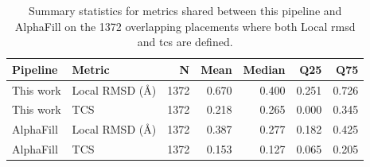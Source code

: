 \begin{table}[ht]
    \centering
    \begin{tabular}{llrrrrr}
        \toprule
        Pipeline  & Metric                      & N    & Mean  & Median & Q25   & Q75   \\
        \midrule
        This work & Local RMSD (\si{\angstrom}) & 1372 & 0.670 & 0.400  & 0.251 & 0.726 \\
        This work & TCS                         & 1372 & 0.218 & 0.265  & 0.000 & 0.345 \\
        AlphaFill & Local RMSD (\si{\angstrom}) & 1372 & 0.387 & 0.277  & 0.182 & 0.425 \\
        AlphaFill & TCS                         & 1372 & 0.153 & 0.127  & 0.065 & 0.205 \\
        \bottomrule
    \end{tabular}
    \caption[Pipeline vs. AlphaFill summary statistics]{Summary statistics for metrics shared between this pipeline and AlphaFill on the \num{1372} overlapping placements where both Local \gls{rmsd} and \gls{tcs} are defined.}
    \label{tab:ff-af-summary}
\end{table}
